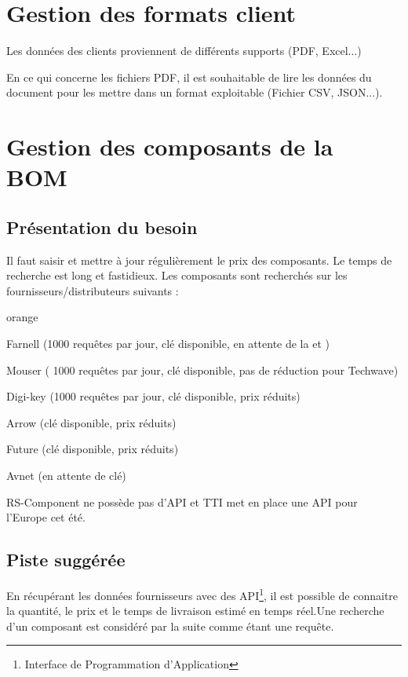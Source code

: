 
\chapter{Gestion des formats client}

Les données des clients proviennent de différents supports (PDF, Excel...)

En ce qui concerne les fichiers PDF, il est souhaitable de lire les données du document pour les mettre dans un format exploitable (Fichier CSV, JSON...).


\chapter{Gestion des composants de la BOM}
\section{Présentation du besoin}

Il faut saisir et mettre à jour régulièrement le prix des composants. Le temps de recherche est long et fastidieux. Les composants sont recherchés sur les fournisseurs/distributeurs suivants  :

\begin{items}{orange}{\Bullet}
\item Farnell (1000 requêtes par jour, clé disponible, en attente de la  et )
\item Mouser ( 1000 requêtes par jour, clé disponible, pas de réduction pour Techwave)
\item Digi-key (1000 requêtes par jour, clé disponible, prix réduits)
\item Arrow (clé disponible, prix réduits)
\item Future (clé disponible, prix réduits)
\item Avnet (en attente de clé)
\end{items}


 RS-Component ne possède pas d'API et TTI met en place une API pour l'Europe cet été.
 
\section{Piste suggérée}

En récupérant les données fournisseurs avec des API\footnote{Interface de Programmation d'Application}, il est possible de connaitre la quantité, le prix et le temps de livraison estimé en temps réel.Une recherche d'un composant est considéré par la suite comme étant une requête.\\

